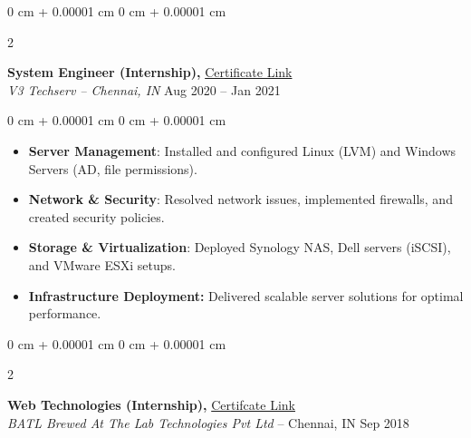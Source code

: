 \documentclass[10pt, letterpaper]{article}
\newenvironment{highlights}{
    \begin{itemize}[
        topsep=0.10 cm,
        parsep=0.10 cm,
        partopsep=0pt,
        itemsep=0pt,
        leftmargin=0 cm + 10pt
    ]
}{
    \end{itemize}
} %
\newenvironment{onecolentry}{
    \begin{adjustwidth}{
        0 cm + 0.00001 cm
    }{
        0 cm + 0.00001 cm
    }
}{
    \end{adjustwidth}
} %
\newenvironment{twocolentry}[2][]{
    \onecolentry
    \def\secondColumn{#2}
    \setcolumnwidth{\fill, 4.5 cm}
    \begin{paracol}{2}
}{
    \switchcolumn \raggedleft \secondColumn
    \end{paracol}
    \endonecolentry
} %
\begin{document}
\vspace{0.25 cm}

 \begin{twocolentry}{
            Aug 2020 – Jan 2021
        }
            \textbf{System Engineer (Internship),} \href{https://drive.google.com/file/d/19B121Beiq6GpOEeABOY-055KPud_YTk-/view}{Certificate Link}\\\textit{V3 Techserv -- Chennai, IN}\end{twocolentry}
            

        \vspace{0.18 cm}
        \begin{onecolentry}
            \begin{highlights}
                \item 

\textbf{Server Management}: Installed and configured Linux (LVM) and Windows Servers (AD, file permissions).
                \item 

\textbf{Network \& Security}: Resolved network issues, implemented firewalls, and created security policies.
                \item

\textbf{Storage \& Virtualization}: Deployed Synology NAS, Dell servers (iSCSI), and VMware ESXi setups.
                \item 
\textbf{Infrastructure Deployment: }Delivered scalable server solutions for optimal performance.
            \end{highlights}
        \end{onecolentry}

\vspace{0.25 cm}

 \begin{twocolentry}{
            Sep 2018
        }
            \textbf{Web Technologies (Internship), }\href{https://drive.google.com/file/d/1F009XaW4LDZ6vV1w_uDFOU3FUaD3gHIG/view}{ Certifcate Link}\\ \textit{BATL Brewed At The Lab Technologies Pvt Ltd}  -- Chennai, IN\end{twocolentry}
\end{document}

